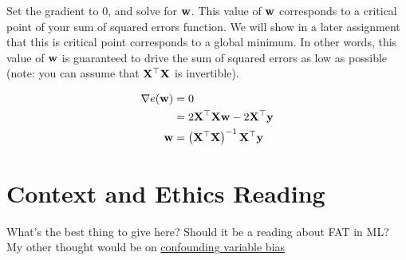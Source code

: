 \documentclass{tufte-handout}
\begin{document}
\begin{exercise}[60 minutes]
\item Set the gradient to 0, and solve for $\mathbf{w}$.  This value of $\mathbf{w}$ corresponds to a critical point of your sum of squared errors function.  We will show in a later assignment that this is critical point corresponds to a global minimum.  In other words, this value of $\mathbf{w}$ is guaranteed to drive the sum of squared errors as low as possible (note: you can assume that $\mathbf{X}^\top \mathbf{X}$ is invertible).

\begin{boxedsolution}
\begin{align}
\nabla e(\mathbf{w})  &= 0 \\
&= 2 \mathbf{X}^\top \mathbf{X} \mathbf{w} - 2 \mathbf{X}^\top \mathbf{y}\\
\mathbf{w} &= \left ( \mathbf{X}^\top \mathbf{X} \right )^{-1} \mathbf{X}^\top \mathbf{y}
\end{align}
\end{boxedsolution}
\fi

\ees
\end{exercise}
%



\section{Context and Ethics Reading}
What's the best thing to give here?  Should it be a reading about FAT in ML?  My other thought would be on \href{https://statisticsbyjim.com/regression/confounding-variables-bias/}{confounding variable bias}
\end{document}
